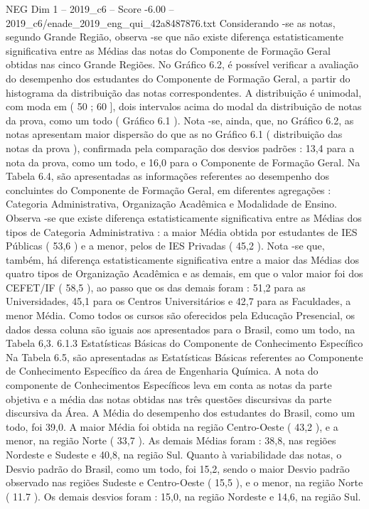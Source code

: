 \begin{textsample}{NEG Dim 1 – 2019\_c6 – Score -6.00 – 2019\_c6/enade\_2019\_eng\_qui\_42a8487876.txt}
Considerando -se as notas, segundo Grande Região, observa -se que não existe diferença estatisticamente significativa entre as Médias das notas do Componente de Formação Geral obtidas nas cinco Grande Regiões.
No Gráfico 6.2, é possível verificar a avaliação do desempenho dos estudantes do Componente de Formação Geral, a partir do histograma da distribuição das notas correspondentes.
A distribuição é unimodal, com moda em ( 50 ; 60 ], dois intervalos acima do modal da distribuição de notas da prova, como um todo ( Gráfico 6.1 ).
Nota -se, ainda, que, no Gráfico 6.2, as notas apresentam maior dispersão do que as no Gráfico 6.1 ( distribuição das notas da prova ), confirmada pela comparação dos desvios padrões : 13,4 para a nota da prova, como um todo, e 16,0 para o Componente de Formação Geral.
Na Tabela 6.4, são apresentadas as informações referentes ao desempenho dos concluintes do Componente de Formação Geral, em diferentes agregações : Categoria Administrativa, Organização Acadêmica e Modalidade de Ensino.
Observa -se que existe diferença estatisticamente significativa entre as Médias dos tipos de Categoria Administrativa : a maior Média obtida por estudantes de IES Públicas ( 53,6 ) e a menor, pelos de IES Privadas ( 45,2 ).
Nota -se que, também, há diferença estatisticamente significativa entre a maior das Médias dos quatro tipos de Organização Acadêmica e as demais, em que o valor maior foi dos CEFET/IF ( 58,5 ), ao passo que os das demais foram : 51,2 para as Universidades, 45,1 para os Centros Universitários e 42,7 para as Faculdades, a menor Média.
Como todos os cursos são oferecidos pela Educação Presencial, os dados dessa coluna são iguais aos apresentados para o Brasil, como um todo, na Tabela 6,3. 6.1.3 Estatísticas Básicas do Componente de Conhecimento Específico Na Tabela 6.5, são apresentadas as Estatísticas Básicas referentes ao Componente de Conhecimento Específico da área de Engenharia Química.
A nota do componente de Conhecimentos Específicos leva em conta as notas da parte objetiva e a média das notas obtidas nas três questões discursivas da parte discursiva da Área.
A Média do desempenho dos estudantes do Brasil, como um todo, foi 39,0.
A maior Média foi obtida na região Centro-Oeste ( 43,2 ), e a menor, na região Norte ( 33,7 ).
As demais Médias foram : 38,8, nas regiões Nordeste e Sudeste e 40,8, na região Sul.
Quanto à variabilidade das notas, o Desvio padrão do Brasil, como um todo, foi 15,2, sendo o maior Desvio padrão observado nas regiões Sudeste e Centro-Oeste ( 15,5 ), e o menor, na região Norte ( 11.7 ).
Os demais desvios foram : 15,0, na região Nordeste e 14,6, na região Sul.

\end{textsample}
